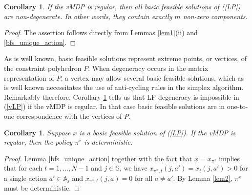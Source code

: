 \documentclass{article}
\newtheorem{corollary}[theorem]{Corollary}
\theoremstyle{definition}
\numberwithin{equation}{section}
\begin{document}
\begin{corollary}
\label{cor4}
If the vMDP is regular, then all basic feasible solutions of {\rm (\ref{LP})} are non-degenerate. In other words, they contain exactly $m$ non-zero components.
\end{corollary}

\begin{proof}
The assertion follows directly from Lemmas \ref{lem1}(ii) and \ref{bfs_unique_action}.
\end{proof}




As is well known, basic feasible solutions represent extreme points,
or vertices, of the constraint polyhedron $P$. 
When degeneracy occurs in the matrix representation of $P$, a vertex
may allow several basic feasible solutions, which as is well known
necessitates the use of anti-cycling rules in the simplex algorithm. Remarkably therefore, Corollary 
\ref{cor4} tells us that LP-degeneracy is impossible in (\ref{vLP}) if the vMDP is regular. In that case basic feasible solutions are in one-to-one correspondence with the vertices of $P$.



\begin{corollary}
\label{cor5}
Suppose $x$ is a basic feasible solution of {\rm (\ref{LP})}. If the vMDP is regular, then the policy $\pi^x$ is deterministic.  %
\end{corollary}

\begin{proof}
Lemma \ref{bfs_unique_action} together with the fact that $x = x_{\pi^x}$ implies that for each $t = 1, ..., N-1$ and $j \in \mathbb{S}$, we have $x_{\pi^x, t}(j, a') = x_t(j, a') > 0$ 
for a single action $a' \in \mathbb{A}_j$ and $x_{\pi^x, t}(j, a) = 0$ for all $a \neq a'$. By Lemma \ref{lem2}, 
$\pi^x$ must be deterministic. 
\end{proof}

\end{document}

